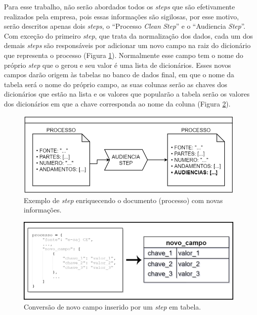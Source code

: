 Para esse trabalho, não serão abordados todos os \textit{steps} que são efetivamente realizados pela empresa, pois essas informações são sigilosas, por esse motivo, serão descritos apenas dois \textit{steps}, o \enquote{Processo \textit{Clean} \textit{Step}} e o \enquote{Audiencia \textit{Step}}. Com exceção do primeiro \textit{step}, que trata da normalização dos dados, cada um dos demais \textit{steps} são responsáveis por adicionar um novo campo na raiz do dicionário que representa o processo (Figura \ref{fig:processoInStep}). Normalmente esse campo tem o nome do próprio \textit{step} que o gerou e seu valor é uma lista de dicionários. Esses novos campos darão origem às tabelas no banco de dados final, em que o nome da tabela será o nome do próprio campo, as suas colunas serão as chaves dos dicionários que estão na lista e os valores que popularão a tabela serão os valores dos dicionários em que a chave corresponda ao nome da coluna (Figura \ref{fig:processoParaTabela}).

\begin{figure}[ht]
\centering
\includegraphics[width=1\textwidth]{imagens/processo-in-step.png}
\caption{Exemplo de \textit{step} enriquecendo o documento (processo) com novas informações.}
\label{fig:processoInStep}
\end{figure}

\begin{figure}[ht]
\centering
\includegraphics[width=1\textwidth]{imagens/processo-para-tabela.png}
\caption{Conversão de novo campo inserido por um \textit{step} em tabela.}
\label{fig:processoParaTabela}
\end{figure}

